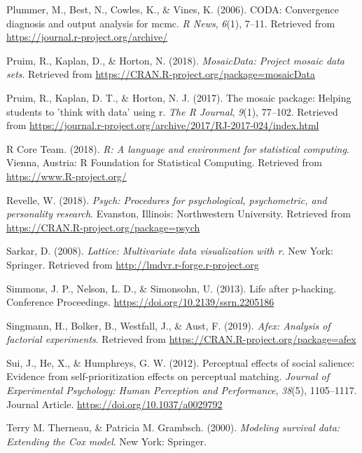 \documentclass[man]{apa6}
\begin{document}
\leavevmode\hypertarget{ref-R-coda}{}%
Plummer, M., Best, N., Cowles, K., \& Vines, K. (2006). CODA: Convergence diagnosis and output analysis for mcmc. \emph{R News}, \emph{6}(1), 7--11. Retrieved from \url{https://journal.r-project.org/archive/}

\leavevmode\hypertarget{ref-R-mosaicData}{}%
Pruim, R., Kaplan, D., \& Horton, N. (2018). \emph{MosaicData: Project mosaic data sets}. Retrieved from \url{https://CRAN.R-project.org/package=mosaicData}

\leavevmode\hypertarget{ref-R-mosaic}{}%
Pruim, R., Kaplan, D. T., \& Horton, N. J. (2017). The mosaic package: Helping students to 'think with data' using r. \emph{The R Journal}, \emph{9}(1), 77--102. Retrieved from \url{https://journal.r-project.org/archive/2017/RJ-2017-024/index.html}

\leavevmode\hypertarget{ref-R-base}{}%
R Core Team. (2018). \emph{R: A language and environment for statistical computing}. Vienna, Austria: R Foundation for Statistical Computing. Retrieved from \url{https://www.R-project.org/}

\leavevmode\hypertarget{ref-R-psych}{}%
Revelle, W. (2018). \emph{Psych: Procedures for psychological, psychometric, and personality research}. Evanston, Illinois: Northwestern University. Retrieved from \url{https://CRAN.R-project.org/package=psych}

\leavevmode\hypertarget{ref-R-lattice}{}%
Sarkar, D. (2008). \emph{Lattice: Multivariate data visualization with r}. New York: Springer. Retrieved from \url{http://lmdvr.r-forge.r-project.org}

\leavevmode\hypertarget{ref-Simmons_2013_life}{}%
Simmons, J. P., Nelson, L. D., \& Simonsohn, U. (2013). Life after p-hacking. Conference Proceedings. \url{https://doi.org/10.2139/ssrn.2205186}

\leavevmode\hypertarget{ref-R-afex}{}%
Singmann, H., Bolker, B., Westfall, J., \& Aust, F. (2019). \emph{Afex: Analysis of factorial experiments}. Retrieved from \url{https://CRAN.R-project.org/package=afex}

\leavevmode\hypertarget{ref-Sui_2012_JEPHPP}{}%
Sui, J., He, X., \& Humphreys, G. W. (2012). Perceptual effects of social salience: Evidence from self-prioritization effects on perceptual matching. \emph{Journal of Experimental Psychology: Human Perception and Performance}, \emph{38}(5), 1105--1117. Journal Article. \url{https://doi.org/10.1037/a0029792}

\leavevmode\hypertarget{ref-R-survival-book}{}%
Terry M. Therneau, \& Patricia M. Grambsch. (2000). \emph{Modeling survival data: Extending the Cox model}. New York: Springer.
\end{document}
